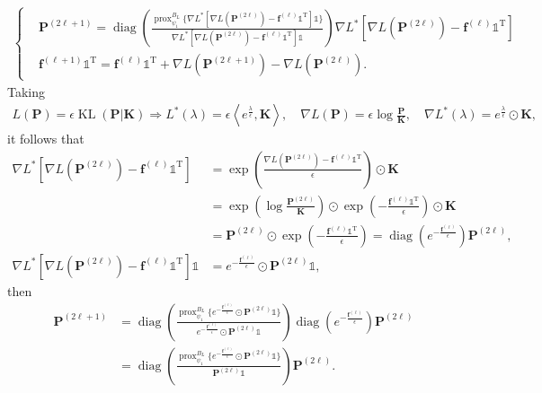\documentclass[11pt]{book}
\newcommand{\prox}{\operatorname{prox}}
\newcommand{\diag}{\operatorname{diag}}
\newcommand{\KL}{\operatorname{KL}}
\begin{document}
\begin{align*}
    \begin{cases}
        &\mathbf{P}^{(2\ell+1)} = \diag 
        \left(  
            \frac{ \prox_{\psi_1}^{B_L} \Big\{ \nabla L^* \left[  \nabla L (\mathbf{P}^{(2\ell)}) - \mathbf{f}^{(\ell)}\mathbb{1}^{\mathrm{T}} \right] \mathbb{1} \Big\}  }{ \nabla L^* \left[  \nabla L (\mathbf{P}^{(2\ell)}) - \mathbf{f}^{(\ell)}\mathbb{1}^{\mathrm{T}} \right] \mathbb{1} } 
        \right) \nabla L^* \left[  \nabla L (\mathbf{P}^{(2\ell)}) - \mathbf{f}^{(\ell)}\mathbb{1}^{\mathrm{T}} \right]\\
        & \mathbf{f}^{(\ell+1)}\mathbb{1}^{\mathrm{T}} = \mathbf{f}^{(\ell)}\mathbb{1}^{\mathrm{T}} + \nabla L(\mathbf{P}^{(2\ell+1)}) - \nabla L(\mathbf{P}^{(2\ell)}).
    \end{cases}
\end{align*}
Taking 
\begin{align*}
    L(\mathbf{P}) = \epsilon \KL(\mathbf{P}|\mathbf{K}) \Longrightarrow
    L^*(\lambda) = \epsilon \left\langle e^{\frac{\lambda}{\epsilon}}, \mathbf{K} \right\rangle, \quad
    \nabla L(\mathbf{P}) = \epsilon \log \frac{\mathbf{P}}{\mathbf{K}}, \quad
    \nabla L^*(\lambda) = e^{\frac{\lambda}{\epsilon}} \odot \mathbf{K},
\end{align*}
it follows that
\begin{align*}
    \nabla L^* \left[  \nabla L (\mathbf{P}^{(2\ell)}) - \mathbf{f}^{(\ell)}\mathbb{1}^{\mathrm{T}} \right] 
    & = \exp \left( \frac{ \nabla L (\mathbf{P}^{(2\ell)}) - \mathbf{f}^{(\ell)}\mathbb{1}^{\mathrm{T}} }{\epsilon} \right) \odot \mathbf{K} \\
    & = \exp \left( \log \frac{\mathbf{P}^{(2\ell)}}{\mathbf{K}}  \right) \odot
    \exp\left(-\frac{\mathbf{f}^{(\ell)}\mathbb{1}^{\mathrm{T}}}{\epsilon}\right) \odot \mathbf{K} \\
    & = \mathbf{P}^{(2\ell)} \odot \exp\left(-\frac{\mathbf{f}^{(\ell)}\mathbb{1}^{\mathrm{T}}}{\epsilon}\right)
    = \diag \left( e^{-\frac{\mathbf{f}^{(\ell)}}{\epsilon}} \right) \mathbf{P}^{(2\ell)}, \\
    \nabla L^* \left[  \nabla L (\mathbf{P}^{(2\ell)}) - \mathbf{f}^{(\ell)}\mathbb{1}^{\mathrm{T}} \right] \mathbb{1} & = e^{-\frac{\mathbf{f}^{(\ell)}}{\epsilon}} \odot  \mathbf{P}^{(2\ell)}\mathbb{1},
\end{align*}
then
\begin{align}
    \mathbf{P}^{(2\ell+1)} &= \diag 
        \left(  
            \frac{ \prox_{\psi_1}^{B_L} \Big\{ e^{-\frac{\mathbf{f}^{(\ell)}}{\epsilon}} \odot  \mathbf{P}^{(2\ell)}\mathbb{1} \Big\}  }{ e^{-\frac{\mathbf{f}^{(\ell)}}{\epsilon}} \odot  \mathbf{P}^{(2\ell)}\mathbb{1} } 
        \right) \diag \left( e^{-\frac{\mathbf{f}^{(\ell)}}{\epsilon}} \right) \mathbf{P}^{(2\ell)} \nonumber\\
        &= \diag 
        \left(  
            \frac{ \prox_{\psi_1}^{B_L} \Big\{ e^{-\frac{\mathbf{f}^{(\ell)}}{\epsilon}} \odot  \mathbf{P}^{(2\ell)}\mathbb{1} \Big\}  }{ \mathbf{P}^{(2\ell)}\mathbb{1} } 
        \right)  \mathbf{P}^{(2\ell)}. \label{eqn:Alternative_Dykstra_temp01}
\end{align}
\end{document}
